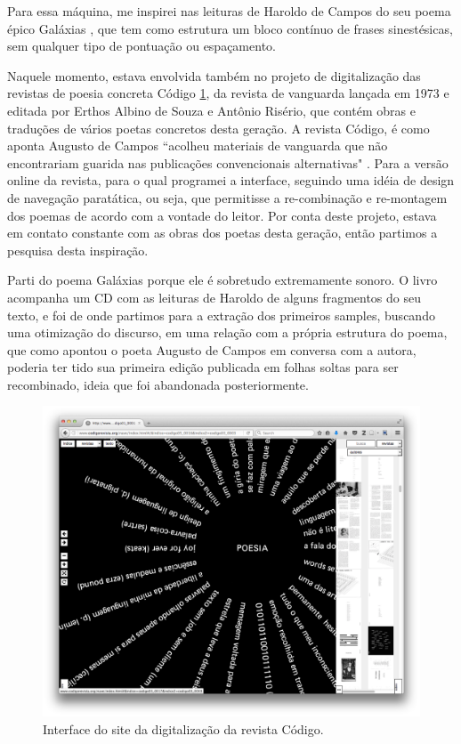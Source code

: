 Para essa máquina, me inspirei nas leituras de Haroldo de Campos do seu poema épico Galáxias \cite{Campos2004}, que tem como estrutura um bloco contínuo de frases sinestésicas, sem qualquer tipo de pontuação ou espaçamento. 

Naquele momento, estava envolvida também no projeto de digitalização das revistas de poesia concreta Código \ref{codigo}, da revista de vanguarda lançada em 1973 e editada por Erthos Albino de Souza e Antônio Risério, que contém obras e traduções de vários poetas concretos desta geração. A revista Código, é como aponta Augusto de Campos ``acolheu materiais de vanguarda que não encontrariam guarida nas publicações convencionais alternativas" \cite{Scandurra2016}. Para a versão online da revista, para o qual programei a interface, seguindo uma idéia de design de navegação paratática, ou seja, que permitisse a re-combinação e re-montagem dos poemas de acordo com a vontade do leitor. Por conta deste projeto, estava em contato constante com as obras dos poetas desta geração, então partimos a pesquisa desta inspiração.

Parti do poema Galáxias porque ele é sobretudo extremamente sonoro. O livro acompanha um CD com as leituras de Haroldo de alguns fragmentos do seu texto, e foi de onde partimos para a extração dos primeiros samples, buscando uma otimização do discurso, em uma relação com a própria estrutura do poema, que como apontou o poeta Augusto de Campos em conversa com a autora, poderia ter tido sua primeira edição publicada em folhas soltas para ser recombinado, ideia que foi abandonada posteriormente.

\begin{figure}[htb]
    \caption{\label{codigo}Interface do site da digitalização da revista Código. }
    \begin{center}
    \includegraphics[width=1\linewidth]{pictures/cap3/codigo5.png}
    \end{center}
\end{figure}

